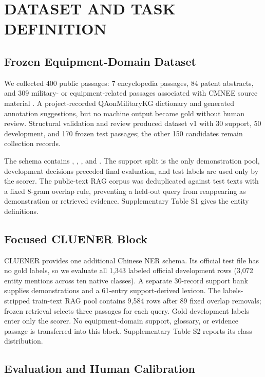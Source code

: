 \section{DATASET AND TASK DEFINITION}

\subsection{Frozen Equipment-Domain Dataset}

We collected 400 public passages: 7 encyclopedia passages, 84 patent abstracts,
and 309 military- or equipment-related passages associated with CMNEE source
material \cite{zhu2024cmnee}. A project-recorded QAonMilitaryKG dictionary and
 generated annotation suggestions, but no
machine output became gold without human review. Structural validation and
review produced dataset v1 with 30 support, 50 development, and 170 frozen test
passages; the other 150 candidates remain collection records.

The schema contains , ,
, and . The support split is the
only demonstration pool, development decisions preceded final evaluation, and
test labels are used only by the scorer. The public-text RAG corpus was
deduplicated against test texts with a fixed 8-gram overlap rule, preventing a
held-out query from reappearing as demonstration or retrieved evidence.
Supplementary Table S1 gives the entity definitions.

\subsection{Focused CLUENER Block}

CLUENER \cite{xu2020cluener} provides one additional Chinese NER schema. Its
official test file has no gold labels, so we evaluate all 1,343 labeled official
development rows (3,072 entity mentions across ten native classes). A separate
30-record support bank supplies demonstrations and a 61-entry support-derived
lexicon. The labels-stripped train-text RAG pool contains 9,584 rows after 89
fixed overlap removals; frozen retrieval selects three passages for each query.
Gold development labels enter only the scorer. No equipment-domain support,
glossary, or evidence passage is transferred into this block. Supplementary
Table S2 reports its class distribution.

\subsection{Evaluation and Human Calibration}

